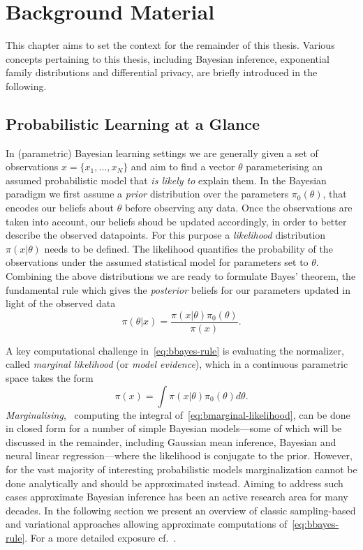 \chapter{Background Material}
\label{chap:chap2}

This chapter aims to set the context for the remainder of this thesis. Various concepts pertaining to this thesis, including Bayesian inference, exponential family distributions and differential privacy, are briefly introduced in the following.

\section{Probabilistic Learning at  a Glance}
\label{sec:b-bayesian-inference}

In (parametric) Bayesian learning settings we are generally given a set of observations $x = \{x_1,...,x_N\}$ and aim to find a vector $\theta $ parameterising an assumed probabilistic model that \emph{is likely to} explain them. In the Bayesian paradigm we first assume a \emph{prior} distribution over the parameters $\pi_0(\theta)$, that encodes our beliefs about $\theta$ before observing any data. Once the observations are taken into account, our beliefs shoud be updated accordingly, in order to better describe the observed datapoints. For this purpose a \emph{likelihood} distribution $\pi(x|\theta)$ needs to be defined. The likelihood quantifies the probability of the observations under the assumed statistical model for parameters set to $\theta$. Combining the above distributions we are ready to formulate Bayes' theorem, the fundamental rule which gives the \emph{posterior} beliefs for our parameters updated in light of the observed data
\[
\pi(\theta|x) = \frac{\pi(x|\theta)\pi_0(\theta)}{\pi(x)}.
\label{eq:bbayes-rule}
\] 

A key computational challenge in~\cref{eq:bbayes-rule} is evaluating the normalizer, called \emph{marginal likelihood} (or \emph{model evidence}), which in a continuous parametric space takes the form
\[
\pi(x) = \int \pi(x|\theta) \pi_0(\theta) d\theta.
\label{eq:bmarginal-likelihood}
\]
\emph{Marginalising}, \ie~computing the integral of~\cref{eq:bmarginal-likelihood}, can be done in closed form for a number of simple Bayesian models---some of which will be discussed in the remainder, including Gaussian mean inference, Bayesian and neural linear regression---where the likelihood is conjugate to the prior. However, for the vast majority of interesting probabilistic models marginalization cannot be done analytically and should be approximated instead. Aiming to address such cases approximate Bayesian inference has been an active research area for many decades. In the following section we present an overview of classic sampling-based and variational approaches allowing approximate computations of~\cref{eq:bbayes-rule}. For a more detailed exposure cf.~\citep{bishop06,murphy12,angelino16}.

